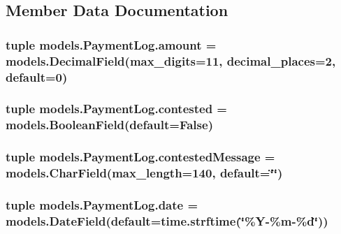 \subsection{Member Data Documentation}
\hypertarget{classmodels_1_1_payment_log_a2e40f261b4736e670761066b1de0d081}{
\subsubsection[{amount}]{\setlength{\rightskip}{0pt plus 5cm}tuple models.\-Payment\-Log.\-amount = models.\-Decimal\-Field(max\-\_\-digits=11, decimal\-\_\-places=2, default=0)\hspace{0.3cm}{\ttfamily [static]}}}\label{classmodels_1_1_payment_log_a2e40f261b4736e670761066b1de0d081}
\hypertarget{classmodels_1_1_payment_log_aaeb60280530dfbff5f6f4c17bed6395c}{
\subsubsection[{contested}]{\setlength{\rightskip}{0pt plus 5cm}tuple models.\-Payment\-Log.\-contested = models.\-Boolean\-Field(default=False)\hspace{0.3cm}{\ttfamily [static]}}}\label{classmodels_1_1_payment_log_aaeb60280530dfbff5f6f4c17bed6395c}
\hypertarget{classmodels_1_1_payment_log_ac1849b45a261444fd1ff697e9e982594}{
\subsubsection[{contested\-Message}]{\setlength{\rightskip}{0pt plus 5cm}tuple models.\-Payment\-Log.\-contested\-Message = models.\-Char\-Field(max\-\_\-length=140, default=\char`\"{}\char`\"{})\hspace{0.3cm}{\ttfamily [static]}}}\label{classmodels_1_1_payment_log_ac1849b45a261444fd1ff697e9e982594}
\hypertarget{classmodels_1_1_payment_log_a52dc6a407079f77462f4be684cf17749}{
\subsubsection[{date}]{\setlength{\rightskip}{0pt plus 5cm}tuple models.\-Payment\-Log.\-date = models.\-Date\-Field(default=time.\-strftime(\char`\"{}\%Y-\/\%m-\/\%d\char`\"{}))\hspace{0.3cm}{\ttfamily [static]}}}\label{classmodels_1_1_payment_log_a52dc6a407079f77462f4be684cf17749}
